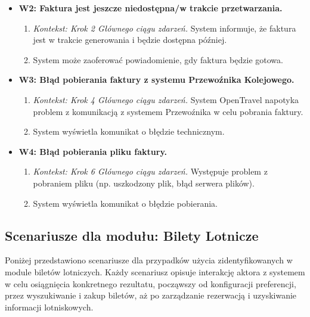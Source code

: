 \documentclass[a4paper,12pt]{article}
\begin{document}
\begin{itemize}
\begin{itemize}
\begin{enumerate}
\end{enumerate}
\item \textbf{W2: Faktura jest jeszcze niedostępna/w trakcie przetwarzania.}
\begin{enumerate}
\item \textit{Kontekst: Krok 2 Głównego ciągu zdarzeń.} System informuje, że faktura jest w trakcie generowania i będzie dostępna później.
\item System może zaoferować powiadomienie, gdy faktura będzie gotowa.
\end{enumerate}
\item \textbf{W3: Błąd pobierania faktury z systemu Przewoźnika Kolejowego.}
\begin{enumerate}
\item \textit{Kontekst: Krok 4 Głównego ciągu zdarzeń.} System OpenTravel napotyka problem z komunikacją z systemem Przewoźnika w celu pobrania faktury.
\item System wyświetla komunikat o błędzie technicznym.
\end{enumerate}
\item \textbf{W4: Błąd pobierania pliku faktury.}
\begin{enumerate}
\item \textit{Kontekst: Krok 6 Głównego ciągu zdarzeń.} Występuje problem z pobraniem pliku (np. uszkodzony plik, błąd serwera plików).
\item System wyświetla komunikat o błędzie pobierania.
\end{enumerate}
\end{itemize}
\end{itemize}

\subsection{Scenariusze dla modułu: Bilety Lotnicze}
Poniżej przedstawiono scenariusze dla przypadków użycia zidentyfikowanych w module biletów lotniczych. Każdy scenariusz opisuje interakcję aktora z systemem w celu osiągnięcia konkretnego rezultatu, począwszy od konfiguracji preferencji, przez wyszukiwanie i zakup biletów, aż po zarządzanie rezerwacją i uzyskiwanie informacji lotniskowych.
\end{document}
